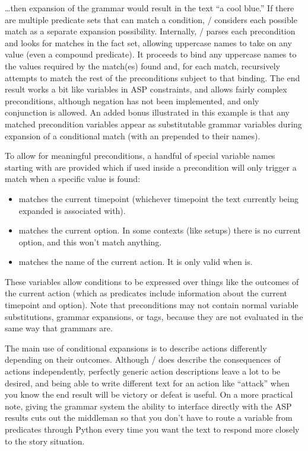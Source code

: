 \noindent \ldots then expansion of the grammar \prq{[[color]]}{} would result in the text ``a cool blue.''
%
If there are multiple predicate sets that can match a condition, \dunyazad/ considers each possible match as a separate expansion possibility.
%
Internally, \dunyazad/ parses each precondition and looks for matches in the fact set, allowing uppercase names to take on any value (even a compound predicate).
%
It proceeds to bind any uppercase names to the values required by the match(es) found and, for each match, recursively attempts to match the rest of the preconditions subject to that binding.
%
The end result works a bit like variables in ASP constraints, and allows fairly complex preconditions, although negation has not been implemented, and only conjunction is allowed.
%
An added bonus illustrated in this example is that any matched precondition variables appear as substitutable grammar variables during expansion of a conditional match (with an \exchar{\_} prepended to their names).


To allow for meaningful preconditions, a handful of special variable names starting with \exchar{\_} are provided which if used inside a precondition will only trigger a match when a specific value is found:
%
\begin{itemize}
  \item {} matches the current timepoint (whichever timepoint the text currently being expanded is associated with).
  \item {} matches the current option. In some contexts (like setups) there is no current option, and this won't match anything.
  \item {} matches the name of the current action. It is only valid when  is.
\end{itemize}
%
These variables allow conditions to be expressed over things like the outcomes of the current action (which as predicates include information about the current timepoint and option).
%
Note that preconditions may not contain normal variable substitutions, grammar expansions, or tags, because they are not evaluated in the same way that grammars are.


The main use of conditional expansions is to describe actions differently depending on their outcomes.
%
Although \dunyazad/ does describe the consequences of actions independently, perfectly generic action descriptions leave a lot to be desired, and being able to write different text for an action like ``attack'' when you know the end result will be victory or defeat is useful.
%
On a more practical note, giving the grammar system the ability to interface directly with the ASP results cuts out the middleman so that you don't have to route a variable from predicates through Python every time you want the text to respond more closely to the story situation.


